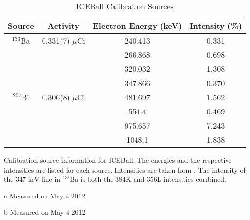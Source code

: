 \begin{table}[]
    \centering
    \begin{threeparttable}
    \caption{ICEBall Calibration Sources}
        \label{tab:ICE_Cal_Source}
    \begin{tabular}{c|c|c|c} \toprule
         Source & Activity & Electron Energy (keV) & Intensity (\%)\\
          \hline 
         $^{133}$Ba & 0.331(7) $\mu$Ci\tnote{a} & 240.413 & 0.331 \\
         & & 266.868 & 0.698 \\
         & & 320.032 & 1.308 \\
         & & 347.866 & 0.370 \\
         \hline
         $^{207}$Bi & 0.306(8) $\mu$Ci\tnote{b} & 481.697 & 1.562 \\ 
         & & 554.4 & 0.469 \\
         & & 975.657 & 7.243 \\
         & & 1048.1 & 1.838 \\\bottomrule
    \end{tabular}
    \begin{tablenotes}[para]
    Calibration source information for ICEBall. The energies and the respective intensities are listed for each source. Intensities are taken from \cite{trzaska90:_calibration}. The intensity of the 347 keV line in $^{133}$Ba is both the 384K and 356L intensities combined.
    \newline\item{a} Measured on May-4-2012
    \newline\item {b} Measured on May-4-2012
    \end{tablenotes}
\end{threeparttable}
\end{table}